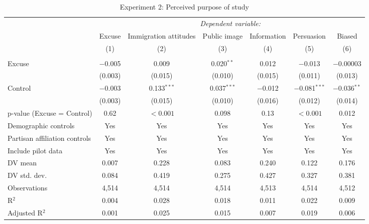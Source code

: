 
\begin{table}[!htbp] \centering 
  \caption{Experiment 2: Perceived purpose of study} 
  \label{t:2-purpose} 
\begin{threeparttable}
\begin{tabular}{@{\hspace{5pt}}l@{\hspace{5pt}}cccccc} 
\toprule 
 & \multicolumn{6}{c}{\textit{Dependent variable:}} \\ 
\cmidrule(rr){2-7} 
 & Excuse & Immigration attitudes & Public image & Information & Persuasion & Biased \\ 
 & (1) & (2) & (3) & (4) & (5) & (6)\\ 
\midrule  
\\[-2.1ex] Excuse & $-$0.005 & 0.009 & 0.020$^{**}$ & 0.012 & $-$0.013 & $-$0.00003 \\ 
  & (0.003) & (0.015) & (0.010) & (0.015) & (0.011) & (0.013) \\ 
 \addlinespace 
 Control & $-$0.003 & 0.133$^{***}$ & 0.037$^{***}$ & $-$0.012 & $-$0.081$^{***}$ & $-$0.036$^{**}$ \\ 
  & (0.003) & (0.015) & (0.010) & (0.016) & (0.012) & (0.014) \\ 
 \addlinespace 
p-value (Excuse = Control) & 0.62 & $<0.001$ & 0.098 & 0.13 & $<0.001$ & 0.012 \\ 
\midrule  
Demographic controls & Yes & Yes & Yes & Yes & Yes & Yes \\ 
Partisan affiliation controls & Yes & Yes & Yes & Yes & Yes & Yes \\ 
\midrule
Include pilot data & Yes & Yes & Yes & Yes & Yes & Yes \\
\addlinespace
DV mean & 0.007 & 0.228 & 0.083 & 0.240 & 0.122 & 0.176 \\
DV std. dev. & 0.084 & 0.419 & 0.275 & 0.427 & 0.327 & 0.381 \\
Observations & 4,514 & 4,514 & 4,514 & 4,513 & 4,514 & 4,512 \\ 
R$^{2}$ & 0.004 & 0.028 & 0.018 & 0.011 & 0.022 & 0.009 \\ 
Adjusted R$^{2}$ & 0.001 & 0.025 & 0.015 & 0.007 & 0.019 & 0.006 \\ 
\bottomrule 
\end{tabular} 
\begin{tablenotes}
\footnotesize

\end{tablenotes}
\end{threeparttable}
\end{table}
